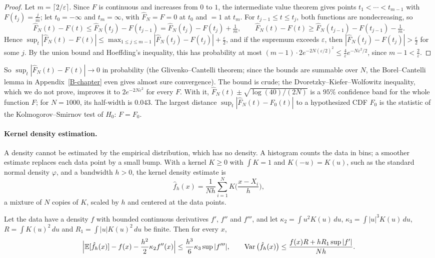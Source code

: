 \begin{proof}
    Let $m = \lceil 2/\varepsilon \rceil$. Since $F$ is continuous and increases from $0$ to $1$, the intermediate value theorem gives points $t_1 < \cdots < t_{m-1}$ with $F(t_j) = \frac{j}{m}$; let $t_0 = -\infty$ and $t_m = \infty$, with $\hat F_N = F = 0$ at $t_0$ and $= 1$ at $t_m$. For $t_{j-1} \leq t \leq t_j$, both functions are nondecreasing, so
    \[\hat F_N(t) - F(t) \leq \hat F_N(t_j) - F(t_{j-1}) = \hat F_N(t_j) - F(t_j) + \tfrac{1}{m}, \qquad \hat F_N(t) - F(t) \geq \hat F_N(t_{j-1}) - F(t_{j-1}) - \tfrac{1}{m}.\]
    Hence $\sup_t |\hat F_N(t) - F(t)| \leq \max_{1 \leq j \leq m-1} |\hat F_N(t_j) - F(t_j)| + \frac{\varepsilon}{2}$, and if the supremum exceeds $\varepsilon$, then $|\hat F_N(t_j) - F(t_j)| > \frac{\varepsilon}{2}$ for some $j$. By the union bound and Hoeffding's inequality, this has probability at most $(m - 1) \cdot 2e^{-2N(\varepsilon/2)^2} \leq \frac{4}{\varepsilon}e^{-N\varepsilon^2/2}$, since $m - 1 < \frac{2}{\varepsilon}$.
\end{proof}

So $\sup_t |\hat F_N(t) - F(t)| \to 0$ in probability (the Glivenko--Cantelli theorem; since the bounds are summable over $N$, the Borel--Cantelli lemma in Appendix~\ref{B-chapter} even gives almost sure convergence). The bound is crude; the Dvoretzky--Kiefer--Wolfowitz inequality, which we do not prove, improves it to $2e^{-2N\varepsilon^2}$ for every $F$. With it, $\hat F_N(t) \pm \sqrt{\log(40)/(2N)}$ is a $95\%$ confidence band for the whole function $F$; for $N = 1000$, its half-width is $0.043$. The largest distance $\sup_t |\hat F_N(t) - F_0(t)|$ to a hypothesized CDF $F_0$ is the statistic of the Kolmogorov--Smirnov test of $H_0$: $F = F_0$.

\paragraph{Kernel density estimation.} A density cannot be estimated by the empirical distribution, which has no density. A histogram counts the data in bins; a smoother estimate replaces each data point by a small bump. With a kernel $K \geq 0$ with $\int K = 1$ and $K(-u) = K(u)$, such as the standard normal density $\varphi$, and a bandwidth $h > 0$, the kernel density estimate is
\[\hat f_h(x) = \frac{1}{Nh}\sum_{i=1}^N K\Big(\frac{x - X_i}{h}\Big),\]
a mixture of $N$ copies of $K$, scaled by $h$ and centered at the data points.

\begin{proposition}\label{L4-prop:kde}
    Let the data have a density $f$ with bounded continuous derivatives $f'$, $f''$ and $f'''$, and let $\kappa_2 = \int u^2K(u)\, du$, $\kappa_3 = \int |u|^3K(u)\, du$, $R = \int K(u)^2\, du$ and $R_1 = \int |u|K(u)^2\, du$ be finite. Then for every $x$,
    \[\Big|\mathbb{E}[\hat f_h(x)] - f(x) - \frac{h^2}{2}\kappa_2f''(x)\Big| \leq \frac{h^3}{6}\kappa_3\sup|f'''|, \qquad \operatorname{Var}\big(\hat f_h(x)\big) \leq \frac{f(x)R + hR_1\sup|f'|}{Nh}.\]
\end{proposition}

